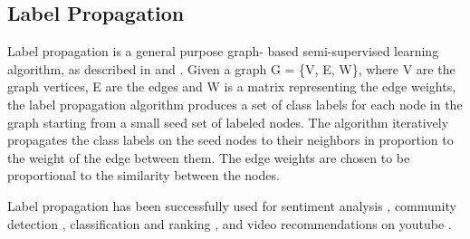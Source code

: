 \subsection{Label Propagation} 

Label propagation is a general purpose graph- based semi-supervised learning
algorithm, as described in  and .
Given a graph G = \{V, E, W\}, where V are the graph vertices, E are the edges
and W is a matrix representing the edge weights, the label propagation
algorithm produces a set of class labels for each node in the graph starting
from a small seed set of labeled nodes. The algorithm iteratively propagates
the class labels on the seed nodes to their neighbors in proportion to the
weight of the edge between them. The edge weights are chosen to be
proportional to the similarity between the nodes.

\par Label propagation has been successfully used for sentiment analysis
, community detection ,
classification and ranking , and video recommendations on
youtube .
